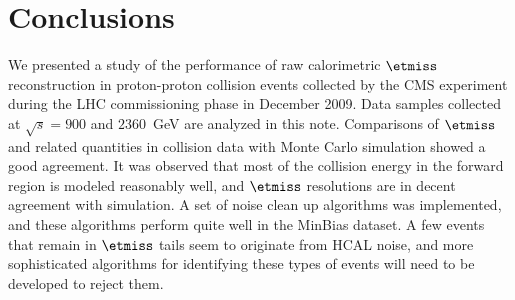 \section{Conclusions}
We presented a study of the performance of raw calorimetric $\etmiss$
reconstruction in proton-proton collision events collected by the CMS
experiment during the LHC commissioning phase in December 2009. Data
samples collected at $\sqrt{s}=900$ and $2360$~GeV are analyzed in this
note. Comparisons of $\etmiss$ and related quantities in collision data
with Monte Carlo simulation showed a good agreement. It was observed
that most of the collision energy in the forward region is modeled
reasonably well, and $\etmiss$ resolutions are in decent agreement with
simulation. A set of noise clean up algorithms was implemented, and
these algorithms perform quite well in the MinBias dataset. A few events that
remain in $\etmiss$ tails seem to originate from HCAL noise, and more
sophisticated algorithms for identifying these types of events will need
to be developed to reject them. 